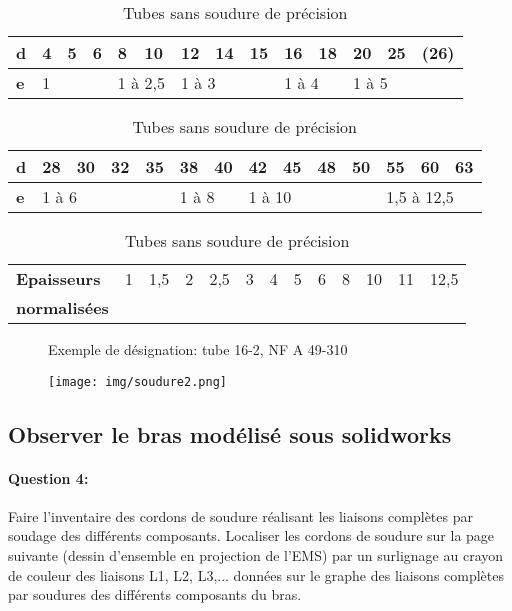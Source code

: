 \begin{table}[!h]
 \begin{center}
  \begin{tabularx}{\linewidth}{|X|l|l|l|l|l|l|l|l|l|l|l|l|l|}
  \hline
  \textbf{d} & 4 & 5 & 6 & 8 & 10 & 12 & 14 & 15 & 16 & 18 & 20 & 25 & (26) \\
  \hline
  \textbf{e} & \multicolumn{3}{l|}{1} & \multicolumn{2}{l|}{1 à 2,5} & \multicolumn{3}{l|}{1 à 3} & \multicolumn{2}{l|}{1 à 4} & \multicolumn{3}{l|}{1 à 5} \\ 
  \hline
  \end{tabularx}
  \begin{tabularx}{\linewidth}{|X|l|l|l|l|l|l|l|l|l|l|l|l|l|}
  \hline
  \textbf{d} & 28 & 30 & 32 & 35 & 38 & 40 & 42 & 45 & 48 & 50 & 55 & 60 & 63 \\
  \hline
  \textbf{e} & \multicolumn{4}{l|}{1 à 6} & \multicolumn{2}{l|}{1 à 8} & \multicolumn{4}{l|}{1 à 10} & \multicolumn{3}{l|}{1,5 à 12,5} \\ 
  \hline
  \end{tabularx}
  \begin{tabularx}{\linewidth}{|X|l|l|l|l|l|l|l|l|l|l|l|l|}
  \hline
  \textbf{Epaisseurs } & 1 & 1,5 & 2 & 2,5 & 3 & 4 & 5 & 6 & 8 & 10 & 11 & 12,5 \\
  \textbf{normalisées} & & & & & & & & & & & & \\
  \hline
  \end{tabularx}
 \end{center}
  \caption{Tubes sans soudure de précision}
  \label{tab:tableau2}
\end{table}

\begin{figure}[!h]
 \begin{minipage}{0.69\linewidth}
 Exemple de désignation: tube 16-2, NF A 49-310
 \end{minipage}
 \hfill
 \begin{minipage}{0.3\linewidth}
  \centering\texttt{[image: img/soudure2.png]}
 \end{minipage}
\end{figure}

\subsection{Observer le bras modélisé sous solidworks}

\paragraph{Question 4:} Faire l'inventaire des cordons de soudure réalisant les liaisons complètes par soudage des différents composants. Localiser les cordons de soudure sur la page suivante (dessin d'ensemble en projection de l'EMS) par un surlignage au crayon de couleur des liaisons L1, L2, L3,... données sur le graphe des liaisons complètes par soudures des différents composants du bras.

